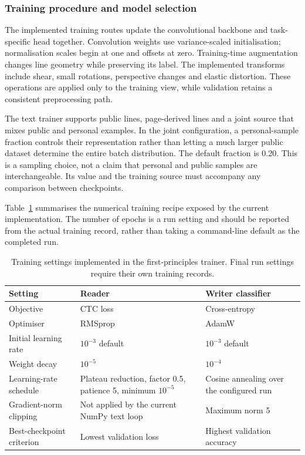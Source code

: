 \subsubsection{Training procedure and model selection}
\label{sec:des-training}
The implemented training routes update the convolutional backbone and task-specific head together. Convolution weights use variance-scaled initialisation; normalisation scales begin at one and offsets at zero. Training-time augmentation changes line geometry while preserving its label. The implemented transforms include shear, small rotations, perspective changes and elastic distortion. These operations are applied only to the training view, while validation retains a consistent preprocessing path.


The text trainer supports public lines, page-derived lines and a joint source that mixes public and personal examples. In the joint configuration, a personal-sample fraction controls their representation rather than letting a much larger public dataset determine the entire batch distribution. The default fraction is 0.20. This is a sampling choice, not a claim that personal and public samples are interchangeable. Its value and the training source must accompany any comparison between checkpoints.

Table~\ref{tab:des-training} summarises the numerical training recipe exposed by the current implementation. The number of epochs is a run setting and should be reported from the actual training record, rather than taking a command-line default as the completed run.


\begin{table}[!htbp]\centering\small
\begin{tabularx}{\linewidth}{|l|X|X|}
\hline\textbf{Setting}&\textbf{Reader}&\textbf{Writer classifier}\\\hline
Objective&CTC loss&Cross-entropy\\\hline
Optimiser&RMSprop&AdamW\\\hline
Initial learning rate&$10^{-3}$ default&$10^{-3}$ default\\\hline
Weight decay&$10^{-5}$&$10^{-4}$\\\hline
Learning-rate schedule&Plateau reduction, factor 0.5, patience 5, minimum $10^{-5}$&Cosine annealing over the configured run\\\hline
Gradient-norm clipping&Not applied by the current NumPy text loop&Maximum norm 5\\\hline
Best-checkpoint criterion&Lowest validation loss&Highest validation accuracy\\\hline
\end{tabularx}
\caption{Training settings implemented in the first-principles trainer. Final run settings require their own training records.}
\label{tab:des-training}
\end{table}

